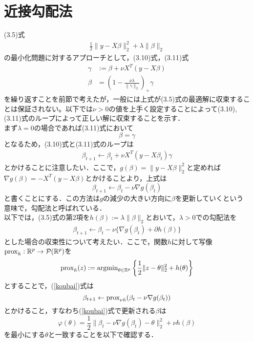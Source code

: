 \documentclass{jsarticle}
\theoremstyle{definition}
\theoremstyle{mystyle} %
\begin{document}
\large
\section*{近接勾配法}
(3.5)式
\begin{align}
\tag{3.5}
\frac{1}{2}\|y-X\beta\|_2^2+\lambda\|\beta\|_2
\end{align}
の最小化問題に対するアプローチとして，(3.10)式，(3.11)式
\begin{align}
\tag{3.10}
\gamma&:=\beta +\nu X^T(y-X\beta)\\
\tag{3.11}
\beta&=\left(1-\frac{\nu\lambda}{\|\gamma\|_2}\right)_+\gamma
\end{align}
を繰り返すことを前節で考えたが，一般には上式が(3.5)式の最適解に収束することは保証されない。以下では$\nu>0$の値を上手く設定することによって(3.10),(3.11)式のループによって正しい解に収束することを示す．\\

まず$\lambda =0$の場合であれば(3.11)式において
$$\beta=\gamma$$
となるため，(3.10)式と(3.11)式のループは
\begin{align*}
\beta_{t+1}\leftarrow \beta_t+\nu X^T(y-X\beta_t)\gamma
\end{align*}
とかけることに注意したい．ここで，$g(\beta)=\|y-X\beta\|_2^2$と定めれば$\nabla g(\beta)=-X^T(y-X\beta)$とかけることより，上式は
$$\beta_{t+1}\leftarrow \beta_t-\nu \nabla g(\beta_t)$$
と書くことにする．この方法は$g$の減少の大きい方向に$\beta$を更新していくという意味で，勾配法と呼ばれている．\\

以下では，(3.5)式の第2項を$h(\beta):=\lambda \|\beta\|_2$とおいて，$\lambda>0$での勾配法を
\begin{align}
\label{koubai}
\beta_{t+1}\leftarrow \beta_t -\nu \{\nabla g(\beta_t)+\partial h(\beta)\}
\end{align}
とした場合の収束性について考えたい．ここで，関数$h$に対して写像${\rm prox}_h:\mathbb{R}^p\to \mathcal{P}(\mathbb{R}^p)$を
\begin{align*}
{\rm prox}_h(z):={\rm argmin }_{\theta \in \mathbb{R}^p}\left\{\frac{1}{2}\|z-\theta\|_2^2+h(\theta)\right\}
\end{align*}
とすることで，(\ref{koubai})式は
$$\beta_{t+1}\leftarrow {\rm prox}_{\nu h}(\beta_t -\nu \nabla g(\beta_t))$$
とかけること，すなわち(\ref{koubai})式で更新される$\beta$は
$$\varphi(\theta)=\frac{1}{2}\|\beta_t-\nu\nabla g(\beta_t)-\theta\|_2^2+\nu h(\beta)$$
を最小にする$\theta$と一致することを以下で確認する．\\
\end{document}
